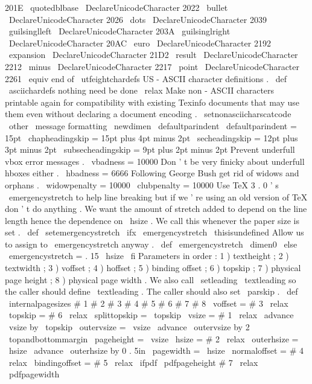 {{{{{{
201E
}
{
\
quotedblbase
}
\
DeclareUnicodeCharacter
{
2022
}
{
\
bullet
}
\
DeclareUnicodeCharacter
{
2026
}
{
\
dots
}
\
DeclareUnicodeCharacter
{
2039
}
{
\
guilsinglleft
}
\
DeclareUnicodeCharacter
{
203A
}
{
\
guilsinglright
}
\
DeclareUnicodeCharacter
{
20AC
}
{
\
euro
}
\
DeclareUnicodeCharacter
{
2192
}
{
\
expansion
}
\
DeclareUnicodeCharacter
{
21D2
}
{
\
result
}
\
DeclareUnicodeCharacter
{
2212
}
{
\
minus
}
\
DeclareUnicodeCharacter
{
2217
}
{
\
point
}
\
DeclareUnicodeCharacter
{
2261
}
{
\
equiv
}
}
%
end
of
\
utfeightchardefs
%
US
-
ASCII
character
definitions
.
\
def
\
asciichardefs
{
%
nothing
need
be
done
\
relax
}
%
Make
non
-
ASCII
characters
printable
again
for
compatibility
with
%
existing
Texinfo
documents
that
may
use
them
even
without
declaring
a
%
document
encoding
.
%
\
setnonasciicharscatcode
\
other
\
message
{
formatting
}
\
newdimen
\
defaultparindent
\
defaultparindent
=
15pt
\
chapheadingskip
=
15pt
plus
4pt
minus
2pt
\
secheadingskip
=
12pt
plus
3pt
minus
2pt
\
subsecheadingskip
=
9pt
plus
2pt
minus
2pt
%
Prevent
underfull
vbox
error
messages
.
\
vbadness
=
10000
%
Don
'
t
be
very
finicky
about
underfull
hboxes
either
.
\
hbadness
=
6666
%
Following
George
Bush
get
rid
of
widows
and
orphans
.
\
widowpenalty
=
10000
\
clubpenalty
=
10000
%
Use
TeX
3
.
0
'
s
\
emergencystretch
to
help
line
breaking
but
if
we
'
re
%
using
an
old
version
of
TeX
don
'
t
do
anything
.
We
want
the
amount
of
%
stretch
added
to
depend
on
the
line
length
hence
the
dependence
on
%
\
hsize
.
We
call
this
whenever
the
paper
size
is
set
.
%
\
def
\
setemergencystretch
{
%
\
ifx
\
emergencystretch
\
thisisundefined
%
Allow
us
to
assign
to
\
emergencystretch
anyway
.
\
def
\
emergencystretch
{
\
dimen0
}
%
\
else
\
emergencystretch
=
.
15
\
hsize
\
fi
}
%
Parameters
in
order
:
1
)
textheight
;
2
)
textwidth
;
%
3
)
voffset
;
4
)
hoffset
;
5
)
binding
offset
;
6
)
topskip
;
%
7
)
physical
page
height
;
8
)
physical
page
width
.
%
%
We
also
call
\
setleading
{
\
textleading
}
so
the
caller
should
define
%
\
textleading
.
The
caller
should
also
set
\
parskip
.
%
\
def
\
internalpagesizes
#
1
#
2
#
3
#
4
#
5
#
6
#
7
#
8
{
%
\
voffset
=
#
3
\
relax
\
topskip
=
#
6
\
relax
\
splittopskip
=
\
topskip
%
\
vsize
=
#
1
\
relax
\
advance
\
vsize
by
\
topskip
\
outervsize
=
\
vsize
\
advance
\
outervsize
by
2
\
topandbottommargin
\
pageheight
=
\
vsize
%
\
hsize
=
#
2
\
relax
\
outerhsize
=
\
hsize
\
advance
\
outerhsize
by
0
.
5in
\
pagewidth
=
\
hsize
%
\
normaloffset
=
#
4
\
relax
\
bindingoffset
=
#
5
\
relax
%
\
ifpdf
\
pdfpageheight
#
7
\
relax
\
pdfpagewidth
}}}}}
